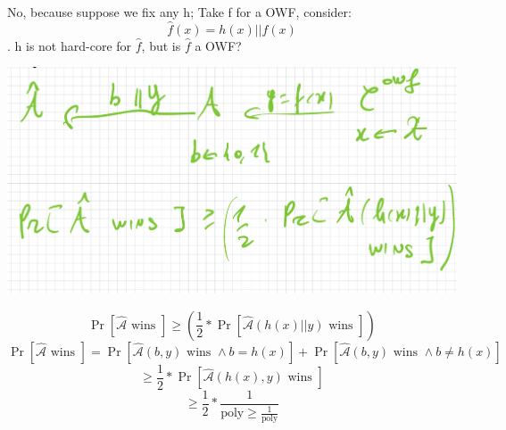 \documentclass[11pt, a4paper]{article}
\begin{document}
No, because suppose we fix any h; Take f for a OWF, consider:
$$\hat{f}(x) = h(x) || f(x)$$.
h is not hard-core for $\hat{f}$, but is $\hat{f}$ a OWF?\\
\begin{center}
    \includegraphics[scale=0.4]{img/Comp_sec/f_hat1.png}
\end{center}
$$\Pr[\hat{\mathcal{A}} \text{ wins }] \geq (\frac{1}{2} * \Pr[\hat{\mathcal{A}}(h(x) || y) \text{ wins }])$$
$$\Pr[\hat{\mathcal{A}} \text{ wins }] = \Pr[\hat{\mathcal{A}}(b,y) \text{ wins } \wedge b = h(x)] + \Pr[\hat{\mathcal{A}}(b,y) \text{ wins } \wedge b \neq h(x)]$$
$$ \geq \frac{1}{2} * \Pr[\hat{\mathcal{A}}(h(x),y) \text{ wins }]$$
$$ \geq \frac{1}{2} * \frac{1}{\text{poly} \geq \frac{1}{\text{poly}}}$$
\end{document}
